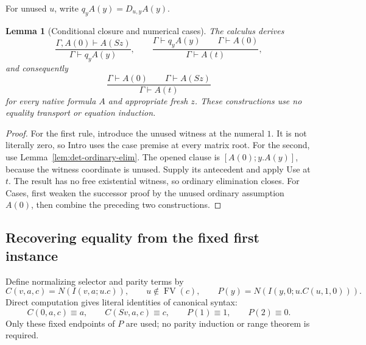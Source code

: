 \documentclass[11pt,a4paper]{article}
\newtheorem{lemma}[theorem]{Lemma}
\theoremstyle{definition}\newtheorem{definition}[theorem]{Definition}
\theoremstyle{remark}\newtheorem{remark}[theorem]{Remark}
\begin{document}
For unused $u$, write $q_y A(y)=D_{u,y}A(y)$.
\begin{lemma}[Conditional closure and numerical cases]
\label{lem:det-cases}
The calculus derives
\[
 \frac{\Gamma,A(0)\vdash A(Sz)}{\Gamma\vdash q_yA(y)},
 \qquad
 \frac{\Gamma\vdash q_yA(y)\qquad\Gamma\vdash A(0)}
      {\Gamma\vdash A(t)},
\]
and consequently
\[
 \frac{\Gamma\vdash A(0)\qquad\Gamma\vdash A(Sz)}
      {\Gamma\vdash A(t)}
 \tag{Cases}\label{eq:det-cases}
\]
for every native formula $A$ and appropriate fresh $z$.
These constructions use no equality transport or equation induction.
\end{lemma}
\begin{proof}
For the first rule, introduce the unused witness at the numeral $1$.
It is not literally zero, so Intro uses the case premise at every matrix
root. For the second, use Lemma~\ref{lem:det-ordinary-elim}. The opened
clause is $[A(0);y.A(y)]$, because the witness coordinate is unused.
Supply its antecedent and apply Use at $t$. The result has no free
existential witness, so ordinary elimination closes. For Cases, first
weaken the successor proof by the unused ordinary assumption $A(0)$,
then combine the preceding two constructions.
\end{proof}

\subsection{Recovering equality from the fixed first instance}

Define normalizing selector and parity terms by
\[
 C(v,a,c)=N(I(v,a;u.c)),\qquad u\notin\operatorname{FV}(c),
 \qquad P(y)=N(I(y,0;u.C(u,1,0))).
\]
Direct computation gives literal identities of canonical syntax:
\[
 C(0,a,c)\equiv a,\qquad C(Sv,a,c)\equiv c,
 \qquad P(1)\equiv1,\qquad P(2)\equiv0.
 \tag{Endpoints}\label{eq:det-endpoints}
\]
Only these fixed endpoints of $P$ are used; no parity induction or range
theorem is required.
\end{document}
